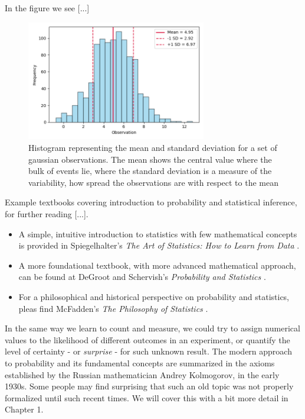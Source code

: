 \documentclass{book}
\begin{document}
In the figure we see [...]

\begin{figure}[ht]
    \centering
    \includegraphics[width=0.7\textwidth]{figures/chapter1/normal_hist.png}
    \caption{Histogram representing the mean and standard deviation for a set of gaussian observations. The mean shows the central value where the bulk of events lie, where the standard deviation is a measure of the variability, how spread the observations are with respect to the mean}
    \label{fig:mean_gaussian}
\end{figure}

Example textbooks covering introduction to probability and statistical inference, for further reading [...].

\begin{itemize}
\item A simple, intuitive introduction to statistics with few mathematical concepts is provided in Spiegelhalter's \textit{The Art of Statistics: How to Learn from Data} \cite{spiegelhalter2019art}. 
\item A more foundational textbook, with more advanced mathematical approach, can be found at DeGroot and Schervish's \textit{Probability and Statistics} \cite{degroot2012probability}.   
\item For a philosophical and historical perspective on probability and statistics, pleas find McFadden's \textit{The Philosophy of Statistics} \cite{mcfadden2011philosophy}.
\end{itemize}

In the same way we learn to count and measure, we could try to assign numerical values to the likelihood of different outcomes in an experiment, or quantify the level of certainty - or \textit{surprise} - for such unknown result. The modern approach to probability and its fundamental concepts are summarized in the axioms established by the Russian mathematician Andrey Kolmogorov, in the early 1930s. Some people may find surprising that such an old topic was not properly formalized until such recent times. We will cover this with a bit more detail in Chapter 1.\\
\end{document}
